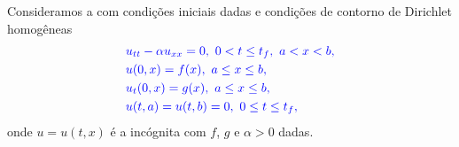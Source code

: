 Consideramos a  com condições iniciais dadas e condições de contorno de Dirichlet homogêneas
\begin{subequations}\label{cap_edp_sec_onda:eq:prob}\hleq
  \begin{align}
    &u_{tt} - \alpha u_{xx} = 0, ~0<t\leq t_f, ~a< x < b, \label{cap_edp_sec_onda:eq:prob_eq}\\
    &u(0,x) = f(x), ~a \leq x \leq b,\label{cap_edp_sec_onda:eq:prob_ci1}\\
    &u_t(0,x) = g(x), ~ a\leq x \leq b,\label{cap_edp_sec_onda:eq:prob_ci2}\\
    &u(t,a) = u(t,b) = 0, ~0 \leq t \leq t_f,\label{cap_edp_sec_onda:eq:prob_bcs}
  \end{align}
\end{subequations}
onde $u = u(t,x)$ é a incógnita com $f$, $g$ e $\alpha>0$ dadas.

